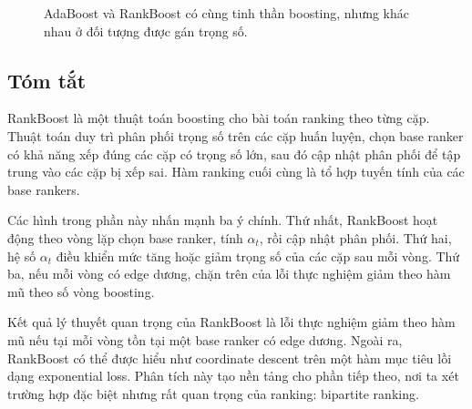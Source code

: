 \begin{figure}[H]
    \centering
    \caption{AdaBoost và RankBoost có cùng tinh thần boosting, nhưng khác nhau ở đối tượng được gán trọng số.}
    \label{fig:section5-adaboost-rankboost}
\end{figure}

\subsection{Tóm tắt}

RankBoost là một thuật toán boosting cho bài toán ranking theo từng cặp. Thuật toán duy trì phân phối trọng số trên các cặp huấn luyện, chọn base ranker có khả năng xếp đúng các cặp có trọng số lớn, sau đó cập nhật phân phối để tập trung vào các cặp bị xếp sai. Hàm ranking cuối cùng là tổ hợp tuyến tính của các base rankers.

Các hình trong phần này nhấn mạnh ba ý chính. Thứ nhất, RankBoost hoạt động theo vòng lặp chọn base ranker, tính \(\alpha_t\), rồi cập nhật phân phối. Thứ hai, hệ số \(\alpha_t\) điều khiển mức tăng hoặc giảm trọng số của các cặp sau mỗi vòng. Thứ ba, nếu mỗi vòng có edge dương, chặn trên của lỗi thực nghiệm giảm theo hàm mũ theo số vòng boosting.

Kết quả lý thuyết quan trọng của RankBoost là lỗi thực nghiệm giảm theo hàm mũ nếu tại mỗi vòng tồn tại một base ranker có edge dương. Ngoài ra, RankBoost có thể được hiểu như coordinate descent trên một hàm mục tiêu lồi dạng exponential loss. Phân tích này tạo nền tảng cho phần tiếp theo, nơi ta xét trường hợp đặc biệt nhưng rất quan trọng của ranking: bipartite ranking.
